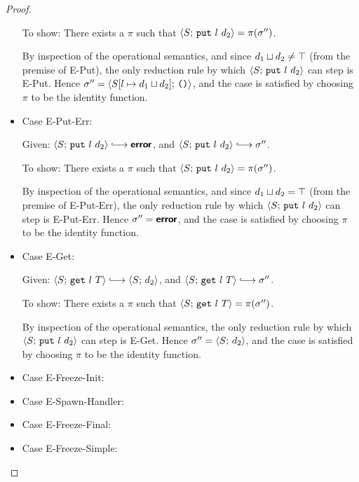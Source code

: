 \begin{proof}
\begin{itemize}
    To show: There exists a $\pi$ such that
    $\langle S;\, \mbox{\texttt{put}}~l~d_2 \rangle = \pi(\sigma'')$.

    By inspection of the operational semantics, and since
    $d_1 \sqcup d_2 \neq \top$ (from the premise of {\sc
      E-Put}), the only reduction rule by which
    $\langle S;\, \mbox{\texttt{put}}~l~d_2 \rangle$ can step is {\sc E-Put}.  Hence
    $\sigma'' = \langle S[l \mapsto d_1 \sqcup d_2];\, \mbox{\texttt{()}} \rangle$,
    and the case is satisfied by choosing $\pi$ to be the identity
    function.

  \item Case {\sc E-Put-Err}:


    Given: $\config{S}{\putexp{l}{d_2}} \parstepsto \error$, and
    $\config{S}{\putexp{l}{d_2}} \parstepsto \conf''$.

    To show: There exists a $\pi$ such that
    $\langle S;\, \mbox{\texttt{put}}~l~d_2 \rangle = \pi(\sigma'')$.

    By inspection of the operational semantics, and since
    $d_1 \sqcup d_2 = \top$ (from the premise of {\sc
      E-Put-Err}), the only reduction rule by which
    $\langle S;\, \mbox{\texttt{put}}~l~d_2 \rangle$ can step is {\sc E-Put-Err}.
    Hence $\sigma'' = \textbf{\textsf{error}}$, and the case is satisfied by choosing
    $\pi$ to be the identity function.

  \item Case {\sc E-Get}:


    Given: $\config{S}{\getexp{l}{T}} \parstepsto \config{S}{d_2}$,
    and $\config{S}{\getexp{l}{T}} \parstepsto \conf''$.

    To show: There exists a $\pi$ such that
    $\langle S;\, \mbox{\texttt{get}}~l~T \rangle = \pi(\sigma'')$.

    By inspection of the operational semantics, the only reduction
    rule by which $\langle S;\, \mbox{\texttt{put}}~l~d_2 \rangle$ can step is {\sc
      E-Get}.  Hence $\sigma'' = \langle S;\, d_2 \rangle$, and the case is
    satisfied by choosing $\pi$ to be the identity
    function.

  \item Case {\sc E-Freeze-Init}:


  \item Case {\sc E-Spawn-Handler}:


  \item Case {\sc E-Freeze-Final}:


  \item Case {\sc E-Freeze-Simple}:


  \end{itemize}
\end{proof}

